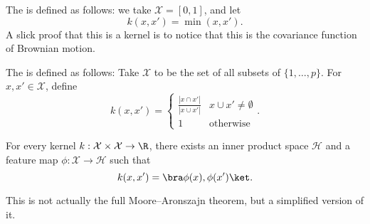 \documentclass[a4paper]{article}
\begin{document}
\begin{eg}
  The  is defined as follows: we take $\mathcal{X} = [0, 1]$, and let
  \[
    k(x, x') = \min(x, x').
  \]
  A slick proof that this is a kernel is to notice that this is the covariance function of Brownian motion.
\end{eg}

\begin{eg}
  The  is defined as follows: Take $\mathcal{X}$ to be the set of all subsets of $\{1, \ldots, p\}$. For $x, x' \in \mathcal{X}$, define
  \[
    k(x, x') =
    \begin{cases}
      \frac{|x \cap x'|}{|x \cup x'|} & x \cup x' \not= \emptyset\\
      1 & \text{otherwise}
    \end{cases}.
  \]
\end{eg}

\begin{thm}
  For every kernel $k: \mathcal{X} \times \mathcal{X} \to \R$, there exists an inner product space $\mathcal{H}$ and a feature map $\phi: \mathcal{X} \to \mathcal{H}$ such that
  \[
    k(x, x') = \bra \phi(x), \phi(x')\ket.
  \]
\end{thm}
This is not actually the full Moore--Aronszajn theorem, but a simplified version of it.
\end{document}
